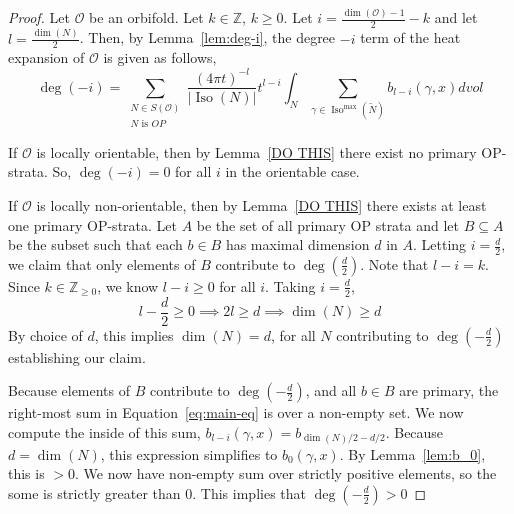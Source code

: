 \documentclass[12pt]{article}
\newcommand{\myabs}[1]{\vert#1\vert}
\theoremstyle{definition}
\DeclareMathOperator{\iso}{Iso}
\newcommand{\orb}{\mathcal O}
\begin{document}
\begin{proof}
    Let $\orb$ be an orbifold. Let $k \in \mathbb{Z}$, $k \geq 0$. Let $i = \frac{\dim(\orb)-1}{2}-k$ and let $l = \frac{\dim(N)}{2}$. Then, by Lemma~\ref{lem:deg-i}, the degree $-i$ term of the heat expansion of $\orb$ is given as follows,
    \begin{equation} \label{eq:main-eq}
        \deg(-i)=\sum_{\substack{N \in S(\orb) \\ N \text{ is } OP}}
        \frac{{(4\pi t)}^{-l}}{\myabs{\iso(N)}} t^{l-i} 
        \int_N \sum_{\gamma \in \iso^{\max}(\tilde{N})} 
        b_{l-i}(\gamma,x)dvol
    \end{equation}

    If $\orb$ is locally orientable, then by Lemma~\ref{DO THIS} there exist no primary OP-strata. So, $\deg(-i)=0$ for all $i$ in the orientable case.

    If $\orb$ is locally non-orientable, then by Lemma~\ref{DO THIS} there exists at least one primary OP-strata. Let $A$ be the set of all primary OP strata and let $B \subseteq A$ be the subset such that each $b \in B$ has maximal dimension $d$ in $A$. Letting $i = \frac{d}{2}$, we claim that only elements of $B$ contribute to $\deg(\frac{d}{2})$. Note that $l-i=k$. Since $k \in \mathbb{Z}_{\geq 0}$, we know $l-i \geq 0$ for all $i$. Taking $i = \frac{d}{2}$,
$$l-\frac{d}{2} \geq 0 \implies 2l \geq d \implies \dim(N) \geq d$$
By choice of $d$, this implies $\dim(N)=d$, for all $N$ contributing to $\deg(-\frac{d}{2})$ establishing our claim.

    Because elements of $B$ contribute to $\deg(-\frac{d}{2})$, and all $b \in B$ are primary, the right-most sum in Equation~\ref{eq:main-eq} is over a non-empty set. We now compute the inside of this sum,
$b_{l-i}(\gamma,x)=b_{\dim(N)/2-d/2}$. Because $d = \dim(N)$, this expression simplifies to $b_0(\gamma,x)$. By Lemma~\ref{lem:b_0}, this is $> 0$. We now have non-empty sum over strictly positive elements, so the some is strictly greater than $0$. This implies that $\deg(-\frac{d}{2}) > 0$ 

\end{proof}
\end{document}
